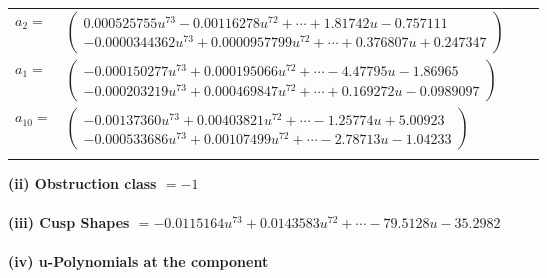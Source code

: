 \documentclass[1p]{elsarticle_modified}
\theoremstyle{definition}
\begin{document}
\begin{tabular}{m{7pt} m{180pt} m{7pt} m{180pt} }
\flushright $a_{2}=$&$\begin{pmatrix}0.000525755 u^{73}-0.00116278 u^{72}+\cdots+1.81742 u-0.757111\\-0.0000344362 u^{73}+0.0000957799 u^{72}+\cdots+0.376807 u+0.247347\end{pmatrix}$ \\
\flushright $a_{1}=$&$\begin{pmatrix}-0.000150277 u^{73}+0.000195066 u^{72}+\cdots-4.47795 u-1.86965\\-0.000203219 u^{73}+0.000469847 u^{72}+\cdots+0.169272 u-0.0989097\end{pmatrix}$ \\
\flushright $a_{10}=$&$\begin{pmatrix}-0.00137360 u^{73}+0.00403821 u^{72}+\cdots-1.25774 u+5.00923\\-0.000533686 u^{73}+0.00107499 u^{72}+\cdots-2.78713 u-1.04233\end{pmatrix}$\\&\end{tabular}
\flushleft \textbf{(ii) Obstruction class $= -1$}\\~\\
\flushleft \textbf{(iii) Cusp Shapes $= -0.0115164 u^{73}+0.0143583 u^{72}+\cdots-79.5128 u-35.2982$}\\~\\
\newpage\renewcommand{\arraystretch}{1}
\flushleft \textbf{(iv) u-Polynomials at the component}\newline \\
\end{document}
